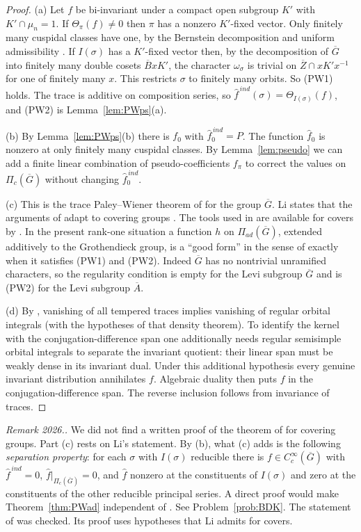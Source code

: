 \documentclass[12pt,letterpaper]{article}
\numberwithin{equation}{section}
\theoremstyle{definition}
\newcounter{rmk}
\newcommand{\unverified}[1]{\refstepcounter{rmk}\par\smallskip\noindent\textit{Remark 2026.\arabic{rmk}.} #1\par\smallskip}
\newcommand{\bG}{\overline{G}}
\newcommand{\bA}{\overline{A}}
\newcommand{\bB}{\overline{B}}
\newcommand{\bZ}{\overline{Z}}
\newcommand{\Pia}{\Pi_{ad}(\bG)}
\begin{document}
\begin{proof}
(a) Let $f$ be bi-invariant under a compact open subgroup $K'$ with $K'\cap\mu_n=1$.  If
$\Theta_\pi(f)\ne0$ then $\pi$ has a nonzero $K'$-fixed vector.  Only finitely many
cuspidal classes have one, by the Bernstein decomposition and uniform admissibility
\cite[Theorems~3.4 and 3.9]{KS23}.  If $I(\sigma)$ has a $K'$-fixed vector then, by the
decomposition of $\bG$ into finitely many double cosets $\bB xK'$, the character
$\omega_\sigma$ is trivial on $\bZ\cap xK'x^{-1}$ for one of finitely many $x$.  This
restricts $\sigma$ to finitely many orbits.  So (PW1) holds.  The trace is additive on
composition series, so $\hat f^{\,ind}(\sigma)=\Theta_{I(\sigma)}(f)$, and (PW2) is
Lemma~\ref{lem:PWps}(a).

(b) By Lemma~\ref{lem:PWps}(b) there is $f_0$ with $\hat f_0^{\,ind}=P$.  The function
$\hat f_0$ is nonzero at only finitely many cuspidal classes.  By Lemma~\ref{lem:pseudo}
we can add a finite linear combination of pseudo-coefficients $f_\pi$ to correct the
values on $\Pi_c(\bG)$ without changing $\hat f_0^{\,ind}$.

(c) This is the trace Paley--Wiener theorem of \cite{BDK86} for the group $\bG$.  Li
states that the arguments of \cite{BDK86} adapt to covering groups
\cite[\S3.4]{Li14}.  The tools used in \cite{BDK86} are available for covers by
\cite{KS23}.  In the present rank-one situation a function $h$ on $\Pia$, extended
additively to the Grothendieck group, is a ``good form'' in the sense of \cite{BDK86}
exactly when it satisfies (PW1) and (PW2).  Indeed $\bG$ has no nontrivial unramified
characters, so the regularity condition is empty for the Levi subgroup $\bG$ and is
(PW2) for the Levi subgroup $\bA$.

(d) By \cite[Th\'eor\`eme~5.8.10]{Li12}, vanishing of all tempered traces
implies vanishing of regular orbital integrals (with the hypotheses of that
density theorem). To identify the kernel with the conjugation-difference span
one additionally needs regular semisimple orbital integrals to separate the
invariant quotient: their linear span must be weakly dense in its invariant
dual. Under this additional hypothesis every genuine invariant distribution
annihilates $f$. Algebraic duality then puts $f$ in the conjugation-difference
span. The reverse inclusion follows from invariance of traces.
\end{proof}

\unverified{We did not find a written proof of the theorem of \cite{BDK86} for covering
groups.  Part (c) rests on Li's statement.  By (b), what (c) adds is the following
\emph{separation property}: for each $\sigma$ with $I(\sigma)$ reducible there is
$f\in C_c^\infty(\bG)$ with $\hat f^{\,ind}=0$, $\hat f|_{\Pi_c(\bG)}=0$, and $\hat f$
nonzero at the constituents of $I(\sigma)$ and zero at the constituents of the other
reducible principal series.  A direct proof would make Theorem~\ref{thm:PWad} independent
of \cite{BDK86}.  See Problem~\ref{prob:BDK}.  The statement of
\cite[Th\'eor\`eme~5.8.10]{Li12} was checked.  Its proof uses hypotheses that Li admits for
covers.}
\end{document}
